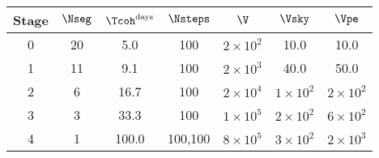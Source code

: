 \begin{tabular}{c|cccccc}
Stage & $\Nseg$ & $\Tcoh^{\rm days}$ &$\Nsteps$ & $\V$ & $\Vsky$ & $\Vpe$ \\ \hline
0 & 20 & 5.0 & 100 & $2{\times}10^{2}$ & 10.0 & 10.0 \\
1 & 11 & 9.1 & 100 & $2{\times}10^{3}$ & 40.0 & 50.0 \\
2 & 6 & 16.7 & 100 & $2{\times}10^{4}$ & $1{\times}10^{2}$ & $2{\times}10^{2}$ \\
3 & 3 & 33.3 & 100 & $1{\times}10^{5}$ & $2{\times}10^{2}$ & $6{\times}10^{2}$ \\
4 & 1 & 100.0 & 100,100 & $8{\times}10^{5}$ & $3{\times}10^{2}$ & $2{\times}10^{3}$ \\
\end{tabular}
